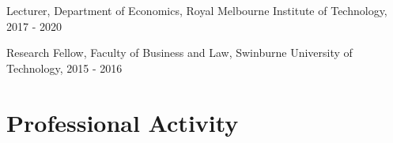 \documentclass[letterpaper]{article}
\renewenvironment{itemize}{
  \begin{list}{}{
    \setlength{\leftmargin}{1.5em}
  }
}{
  \end{list}
}
\begin{document}
\begin{itemize}
	
	
	\item Lecturer, Department of Economics, Royal Melbourne Institute of Technology, 2017 - 2020
		
	\item Research Fellow, Faculty of Business and Law, Swinburne University of Technology, 2015 - 2016
	
\end{itemize}




\section*{Professional Activity}
\end{document}
